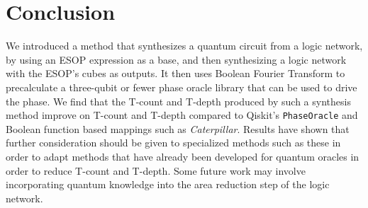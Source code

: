 \section{Conclusion}
\label{Conc}

We introduced a method that synthesizes a quantum circuit from a logic network, by using an ESOP expression as
a base, and then synthesizing a logic network with the ESOP's cubes as outputs. It then uses Boolean
Fourier Transform to precalculate a three-qubit or fewer phase oracle library that can be used to drive the
phase. We find that the T-count and T-depth produced by such a synthesis method improve on T-count and T-depth
compared to Qiskit's \texttt{PhaseOracle} and Boolean function based mappings such as {\it Caterpillar}. Results
have shown that further consideration should be given to specialized methods such as these in order to adapt
methods that have already been developed for quantum oracles in order to reduce T-count and T-depth. Some 
future work may involve incorporating quantum knowledge into the area reduction step of the logic network.

